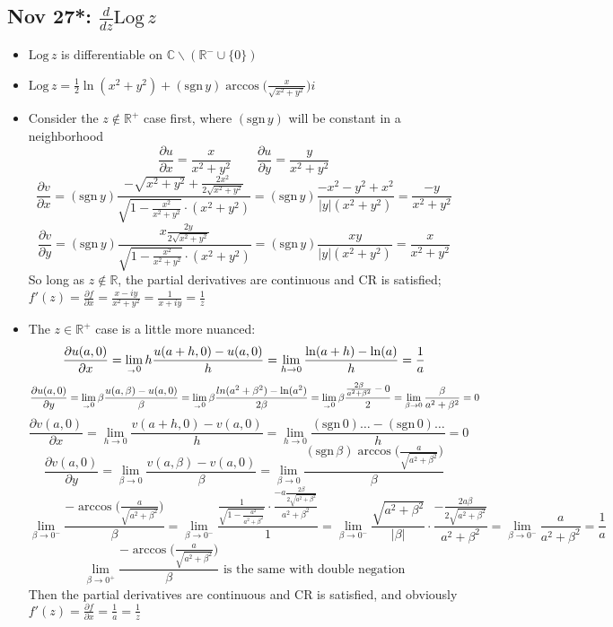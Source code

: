 \documentclass[10pt, oneside]{article}
\let\del\partial
\newcommand{\ltz}[1]{\lim_{#1 \rightarrow 0}}
\newcommand{\R}{\mathbb{R}}
\newcommand{\C}{\mathbb{C}}
\newcommand{\sgn}{\text{sgn} \,}
\newcommand{\Log}{\text{Log} \,}
\begin{document}
\subsection{Nov 27*: $\frac{d}{dz} \Log z$}
\begin{itemize}
    \item $\Log z$ is differentiable on $\C \backslash (\R^- \cup \{0\})$
    \item $\Log z = \frac{1}{2}\ln(x^2 + y^2) + (\sgn y)\arccos\Big(\frac{x}{\sqrt{x^2 + y^2}}\Big)i$
    \item Consider the $z \notin \R^+$ case first, where $(\sgn y)$ will be constant in a neighborhood
        \[\frac{\del u}{\del x} = \frac{x}{x^2+y^2} \quad \quad \frac{\del u}{\del y} = \frac{y}{x^2+y^2}\]
        \[\frac{\del v}{\del x} = (\sgn y)\frac{-\sqrt{x^2+y^2} + \frac{2x^2}{2\sqrt{x^2+y^2}}}{\sqrt{1-\frac{x^2}{x^2+y^2}} \cdot (x^2 + y^2)} = (\sgn y)\frac{-x^2-y^2+x^2}{|y|(x^2+y^2)} = \frac{-y}{x^2+y^2}\]
        \[\frac{\del v}{\del y} = (\sgn y)\frac{x\frac{2y}{2\sqrt{x^2+y^2}}}{\sqrt{1 - \frac{x^2}{x^2+y^2}} \cdot (x^2 + y^2)} = (\sgn y)\frac{xy}{|y|(x^2+y^2)} = \frac{x}{x^2+y^2}\]
        So long as $z \notin \R$, the partial derivatives are continuous and CR is satisfied; $f'(z) = \frac{\del f}{\del x} = \frac{x - iy}{x^2 + y^2} = \frac{1}{x+iy} = \frac{1}{z}$
    \item The $z \in \R^+$ case is a little more nuanced:
        \[\frac{\del u(a,0)}{\del x} = \ltz_{h} \frac{u(a+h,0) - u(a,0)}{h} = \ltz{h} \frac{\ln(a+h) - \ln(a)}{h} = \frac{1}{a}\]
        \[\frac{\del u(a,0)}{\del y} = \ltz_{\beta} \frac{u(a,\beta) - u(a,0)}{\beta} = \ltz_{\beta} \frac{ln(a^2 + \beta^2) - \ln(a^2)}{2\beta} = \ltz_{\beta} \frac{\frac{2\beta}{a^2 + \beta^2} - 0}{2} = \ltz{\beta}  \frac{\beta}{a^2 + \beta^2} = 0\]
        \[\frac{\del v(a,0)}{\del x} = \ltz{h} \frac{v(a+h,0) - v(a,0)}{h} = \ltz{h} \frac{(\sgn 0)\hdots - (\sgn 0)\hdots}{h} = 0\]
        \[\frac{\del v(a,0)}{\del y} = \ltz{\beta} \frac{v(a,\beta) - v(a,0)}{\beta} = \ltz{\beta} \frac{(\sgn \beta) \arccos\Big(\frac{a}{\sqrt{a^2+\beta^2}}\Big)}{\beta}\]
        \[\lim_{\beta \rightarrow 0^-} \frac{-\arccos\Big(\frac{a}{\sqrt{a^2+\beta^2}}\Big)}{\beta} = \lim_{\beta \rightarrow 0^-} \frac{\frac{1}{\sqrt{1-\frac{a^2}{a^2+\beta^2}}} \cdot \frac{-a\frac{2\beta}{2\sqrt{a^2+\beta^2}}}{a^2+\beta^2}}{1} = \lim_{\beta \rightarrow 0^-} \frac{\sqrt{a^2+\beta^2}}{|\beta|} \cdot \frac{-\frac{2a\beta}{2\sqrt{a^2+\beta^2}}}{a^2+\beta^2} = \lim_{\beta \rightarrow 0^-} \frac{a}{a^2 + \beta^2} = \frac{1}{a}\]
        \[\lim_{\beta \rightarrow 0^+} \frac{-\arccos\Big(\frac{a}{\sqrt{a^2+\beta^2}}\Big)}{\beta} \text{ is the same with double negation}\]
        Then the partial derivatives are continuous and CR is satisfied, and obviously $f'(z) = \frac{\del f}{\del x} = \frac{1}{a} = \frac{1}{z}$
\end{itemize}
\end{document}
